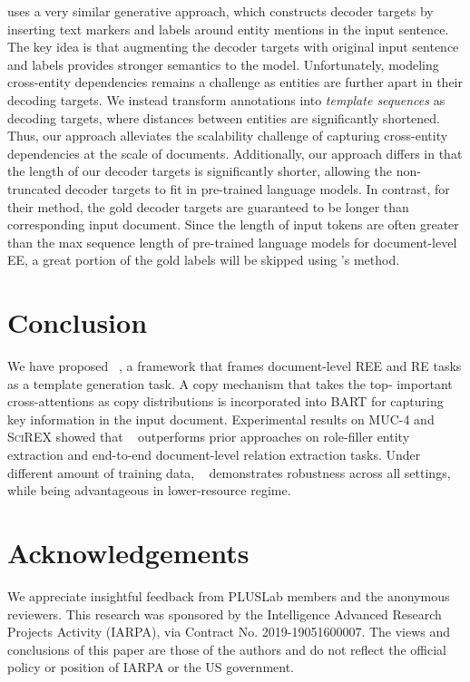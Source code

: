 \documentclass[11pt]{article}
\begin{document}
\citet{paolini2021structured} uses a very similar generative approach, which constructs decoder targets by inserting text markers and labels around entity mentions in the input sentence. The key idea is that augmenting the decoder targets with original input sentence and labels provides stronger semantics to the model. Unfortunately, modeling cross-entity dependencies remains a challenge as entities are further apart in their decoding targets. We instead transform annotations into \textit{template sequences} as decoding targets, where distances between entities are significantly shortened. Thus, our approach alleviates the scalability challenge of capturing cross-entity dependencies at the scale of documents. Additionally, our approach differs in that the length of our decoder targets is significantly shorter, allowing the non-truncated decoder targets to fit in pre-trained language models. In contrast, for their method, the gold decoder targets are guaranteed to be longer than corresponding input document. Since the length of input tokens are often greater than the max sequence length of pre-trained language models for document-level EE, a great portion of the gold labels will be skipped using \citet{paolini2021structured}'s method. 



%
 \section{Conclusion}
We have proposed \modelshort~, a framework that frames document-level REE and RE tasks as a template generation task. A copy mechanism that takes the top- important cross-attentions as copy distributions is incorporated into \textsc{BART} for capturing key information in the input document. Experimental results on MUC-4 and \textsc{SciREX} showed that \modelshort~ outperforms prior approaches on role-filler entity extraction and end-to-end document-level relation extraction tasks. Under different amount of training data, \modelshort~ demonstrates robustness across all settings, while being advantageous in lower-resource regime.

\section*{Acknowledgements}
We appreciate insightful feedback from PLUSLab members and the anonymous reviewers. This research was sponsored by the Intelligence Advanced Research Projects Activity (IARPA), via Contract No. 2019-19051600007. The views and conclusions of this paper are those of the authors and do not reflect the official policy or position of IARPA or the US government. 
\end{document}
